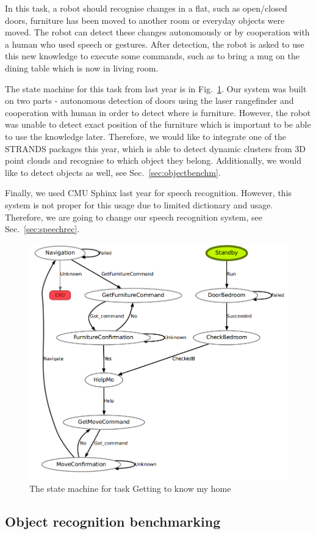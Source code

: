 In this task, a robot should recognise changes in a flat, such as open/closed doors, furniture has been moved to another room or everyday objects were moved. 
The robot can detect these changes autonomously or by cooperation with a human who used speech or gestures.
After detection, the robot is asked to use this new knowledge to execute some commands, such as to bring a mug on the dining table which is now in living room.

The state machine for this task from last year is in Fig.~\ref{fig:st1}.
Our system was built on two parts - autonomous detection of doors using the laser rangefinder and cooperation with human in order to detect where is furniture. 
 However, the robot was unable to detect exact position of the furniture which is important to be able to use the knowledge later. 
Therefore, we would like to integrate one of the STRANDS packages this year, which is able to detect dynamic clusters from 3D point clouds and recognise to which object they belong. 
Additionally, we would like to detect objects as well, see Sec.~\ref{sec:objectbenchm}.

Finally, we used CMU Sphinx last year for speech recognition. 
However, this system is not proper for this usage due to limited dictionary and usage. 
Therefore, we are going to change our speech recognition system, see Sec.~\ref{sec:speechrec}.

\begin{figure}[!htb]
\centering
\includegraphics[width=3.in]{statemachine_t1.png}
\caption{The state machine for task Getting to know my home}
\label{fig:st1}
\end{figure}

\subsection{Object recognition benchmarking} %

